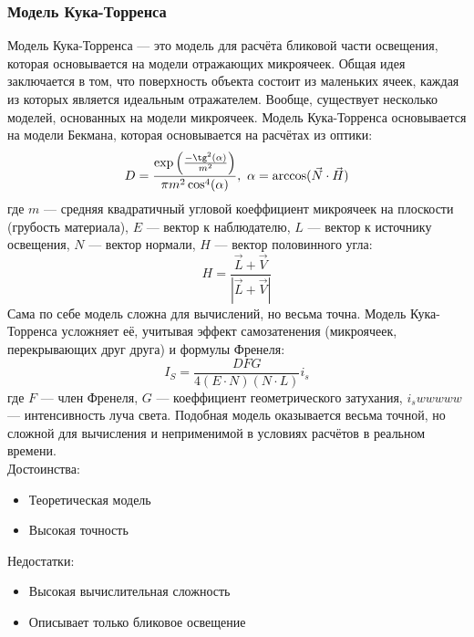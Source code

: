 \documentclass[a4paper,12pt]{report}
\numberwithin{equation}{section}
\begin{document}
\subsubsection*{Модель Кука-Торренса}
Модель Кука-Торренса --- это модель для расчёта бликовой части освещения, которая основывается на модели отражающих микроячеек. Общая идея заключается в том, что поверхность объекта состоит из маленьких ячеек, каждая из которых является идеальным отражателем. Вообще, существует несколько моделей, основанных на модели микроячеек. Модель Кука-Торренса основывается на модели Бекмана, которая основывается на расчётах из оптики:
\begin{equation}
D = \frac{\exp \left( \frac{-\tg^2(\alpha)}{m^2} \right)}{\pi m^2 \cos^4(\alpha)}, ~ \alpha = \arccos(\vec{N} \cdot \vec{H})
\end{equation}
где $m$ --- средняя квадратичный угловой коеффициент микроячеек на плоскости (грубость материала), $E$ --- вектор к наблюдателю, $L$ --- вектор к источнику освещения, $N$ --- вектор нормали, $H$ --- вектор половинного угла:
\begin{equation}
H = \frac{\vec{L} + \vec{V}}{|\vec{L} + \vec{V}|} \label{halfway_vec}
\end{equation}
Сама по себе модель сложна для вычислений, но весьма точна. Модель Кука-Торренса усложняет её, учитывая эффект самозатенения (микроячеек, перекрывающих друг друга) и формулы Френеля:
\begin{equation}
I_S = \frac{D F G}{4(E \cdot N)(N\cdot L)} i_s
\end{equation}
где $F$ --- член Френеля, $G$ --- коеффициент геометрического затухания, $i_swwwww$ --- интенсивность луча света. Подобная модель оказывается весьма точной, но сложной для вычисления и неприменимой в условиях расчётов в реальном времени. \\
Достоинства:
\begin{itemize}
\item Теоретическая модель
\item Высокая точность
\end{itemize}
Недостатки:
\begin{itemize}
\item Высокая вычислительная сложность
\item Описывает только бликовое освещение
\end{itemize}
\end{document}
